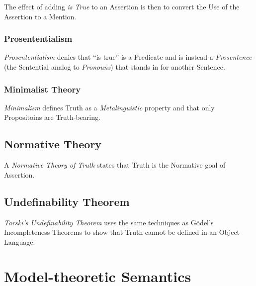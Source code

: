 The effect of adding \emph{is True} to an Assertion is then to convert
the Use of the Assertion to a Mention.



\subsubsection{Prosententialism}\label{sec:prosententialism}

\emph{Prosententialism} denies that ``is true'' is a Predicate and is
instead a \emph{Prosentence} (the Sentential analog to
\emph{Pronouns}) that stands in for another Sentence.



\subsubsection{Minimalist Theory}\label{sec:minimalist_theory}

\emph{Minimalism} defines Truth as a \emph{Metalinguistic} property
and that only Propositoins are Truth-bearing.



\subsection{Normative Theory}\label{sec:normative_theory}

A \emph{Normative Theory of Truth} states that Truth is the Normative
goal of Assertion.



\subsection{Undefinability Theorem}\label{sec:undefinability_theorem}

\emph{Tarski's Undefinability Theorem} \cite{tarski36} uses the same
techniques as G\"odel's Incompleteness Theorems to show that Truth
cannot be defined in an Object Language.



\section{Model-theoretic Semantics}\label{sec:model_semantics}

